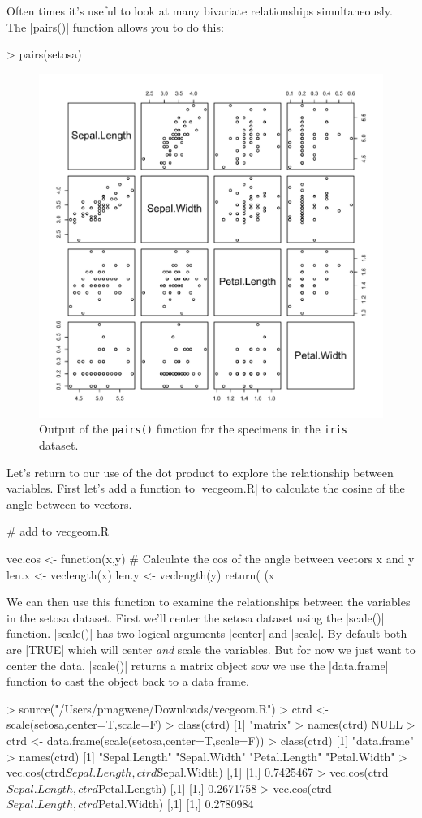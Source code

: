 Often times it's useful to look at many bivariate relationships simultaneously. The |pairs()| function allows you to do this:
%
\begin{R}
> pairs(setosa)
\end{R}
%
\begin{figure}[htbp]
\centering
\includegraphics[width=0.5\columnwidth]{./figures/hands-on2/pairs-output.pdf}
\caption{Output of the \lstinline!pairs()! function for the  specimens in the \lstinline|iris| dataset.}
\end{figure}

Let's return to our use of the dot product to explore the relationship between variables. First let's add a function to |vecgeom.R| to calculate the cosine of the angle between to vectors.
\begin{R}
# add to vecgeom.R

vec.cos <- function(x,y) {
  # Calculate the cos of the angle between vectors x and y
  len.x <- veclength(x)
  len.y <- veclength(y)
  return( (x %
}
\end{R}
We can then use this function to examine the relationships between the variables in the setosa dataset. First we'll center the setosa dataset using the |scale()| function. |scale()| has two logical arguments |center| and |scale|. By default both are |TRUE| which will center \emph{and} scale the variables. But for now we just want to center the data. |scale()| returns a matrix object sow we use the |data.frame| function to cast the object back to a data frame.
\begin{R}
> source("/Users/pmagwene/Downloads/vecgeom.R")
> ctrd <- scale(setosa,center=T,scale=F)
> class(ctrd)
[1] "matrix"
> names(ctrd)
NULL
> ctrd <- data.frame(scale(setosa,center=T,scale=F))
> class(ctrd)
[1] "data.frame"
> names(ctrd)
[1] "Sepal.Length" "Sepal.Width"  "Petal.Length" "Petal.Width"
> vec.cos(ctrd$Sepal.Length, ctrd$Sepal.Width)
          [,1]
[1,] 0.7425467
> vec.cos(ctrd$Sepal.Length, ctrd$Petal.Length)
          [,1]
[1,] 0.2671758
> vec.cos(ctrd$Sepal.Length, ctrd$Petal.Width)
          [,1]
[1,] 0.2780984
\end{R}


